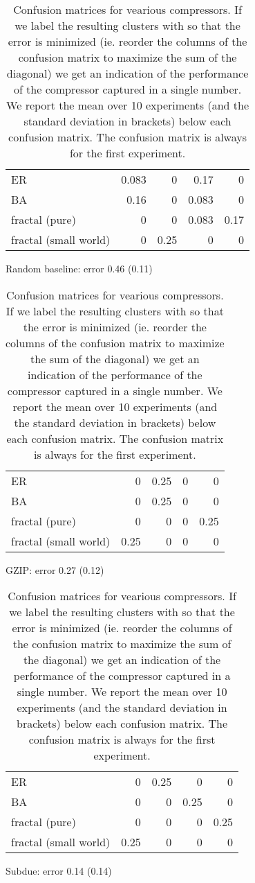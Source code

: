 \documentclass{article}
\begin{document}
\begin{table}[h]

\begin{subfigure}[b]{1\columnwidth}
\begin{tabular}{l |  r r r r}
\hline
  ER                    &  0.083 & 0    & 0.17  & 0 \\
  BA                    &  0.16  & 0    & 0.083 & 0 \\
  fractal (pure)        &  0     & 0    & 0.083 & 0.17 \\
  fractal (small world) &  0     & 0.25 & 0     & 0 \\
\hline
\end{tabular}
\caption{Random baseline: error 0.46 (0.11)}
\end{subfigure}
\vspace{3mm}

\begin{subfigure}[b]{1\columnwidth}
\begin{tabular}{l |  r r r r}
\hline
  ER                    &  0    & 0.25 & 0 & 0 \\
  BA                    &  0    & 0.25 & 0 & 0 \\
  fractal (pure)        &  0    & 0    & 0 & 0.25 \\
  fractal (small world) &  0.25 & 0    & 0 & 0 \\
\hline
\end{tabular}
\caption{GZIP: error 0.27 (0.12)}
\end{subfigure}
\vspace{3mm}

\begin{subfigure}[b]{1\columnwidth}
\begin{tabular}{l |  r r r r}
\hline
  ER                    &  0    & 0.25 & 0    & 0    \\
  BA                    &  0    & 0    & 0.25 & 0    \\
  fractal (pure)        &  0    & 0    & 0    & 0.25 \\
  fractal (small world) &  0.25 & 0    & 0    & 0    \\
\hline
\end{tabular}
\caption{Subdue: error 0.14 (0.14)}
\end{subfigure}
\caption{Confusion matrices for vearious compressors. If we label the resulting clusters with so that the error is minimized (ie. reorder the columns of the confusion matrix to maximize the sum of the diagonal) we get an indication of the performance of the compressor captured in a single number. We report the mean over 10 experiments (and the standard deviation in brackets) below each confusion matrix. The confusion matrix is always for the first experiment.}

\label{table:synthetic-large}

\end{table}
\end{document}

